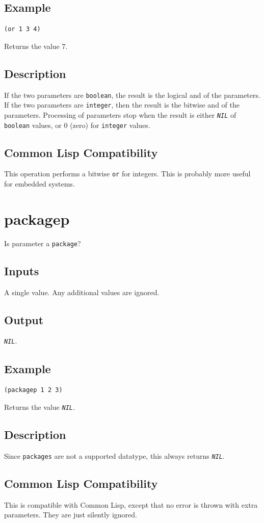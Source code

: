 \documentclass[10pt, openany]{book}
\newcommand{\constant}[1]{\emph{\texttt{#1}}}
\newcommand{\keyword}[1]{\texttt{#1}}
\newcommand{\datatype}[1]{\texttt{#1}}
\newcommand{\cl}{Common Lisp}
\begin{document}
\subsection{Example}
\begin{lstlisting}
(or 1 3 4)
\end{lstlisting}
Returns the value 7.
\subsection{Description}
If the two parameters are \datatype{boolean}, the result is the logical and of the parameters.  If the two parameters are \datatype{integer}, then the result is the bitwise and of the parameters.  Processing of parameters stop when the result is either \constant{NIL} of \datatype{boolean} values, or 0 (zero) for \datatype{integer} values.
\subsection{Common Lisp Compatibility}
This operation performs a bitwise \keyword{or} for integers.  This is probably more useful for embedded systems.

\section{packagep}
Is parameter a \datatype{package}?
\subsection{Inputs}
A single value.  Any additional values are ignored.
\subsection{Output}
\constant{NIL}.
\subsection{Example}
\begin{lstlisting}
(packagep 1 2 3)
\end{lstlisting}
Returns the value \constant{NIL}.
\subsection{Description}
Since \datatype{packages} are not a supported datatype, this always returns \constant{NIL}.
\subsection{Common Lisp Compatibility}
This is compatible with \cl, except that no error is thrown with extra parameters.  They are just silently ignored.
\end{document}
